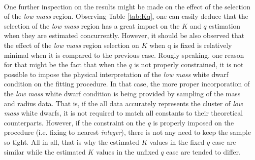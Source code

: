 \documentclass[letterpaper,12pt]{article}
\begin{document}
\begin{table}[H]
\centering
{}
\caption{Estimation of the $K$ and $q$ under different \textit{low mass} region selections}
\label{tab:Kq}
\end{table}

\paragraph{} One further inspection on the results might be made on the effect of the selection of the \textit{low mass} region. Observing Table \ref{tab:Kq}, one can easily deduce that the selection of the \textit{low mass} region has a great impact on the $K$ and $q$ estimation when they are estimated concurrently. However, it should be also observed that the effect of the \textit{low mass} region selection on $K$ when q is fixed is relatively minimal when it is compared to the previous case. Rougly speaking, one reason for that might be the fact that when the $q$ is not properly constrained, it is not possible to impose the physical interpretation of the \textit{low mass} white dwarf condition on the fitting procedure. In that case, the more proper incorporation of the \textit{low mass} white dwarf condition is being provided by sampling of the mass and radius data. That is, if the all data accurately represents the cluster of \textit{low mass} white dwarfs, it is not required to match all constants to their theoretical counterparts. However, if the constraint on the $q$ is properly imposed on the procedure (i.e. fixing to nearest \textit{integer}), there is not any need to keep the sample so tight. All in all, that is why the estimated $K$ values in the fixed $q$ case are similar while the estimated $K$ values in the unfixed $q$ case are tended to differ.
\end{document}
